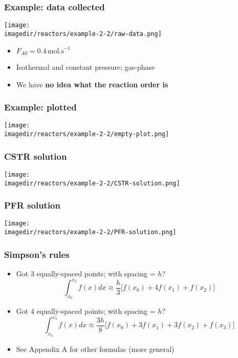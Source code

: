 \begin{frame}\frametitle{Example: data collected}
	\begin{center}
		\texttt{[image: \\imagedir/reactors/example-2-2/raw-data.png]}
	\end{center}
	\vfill
	\begin{itemize}
		\item	$F_{A0} = 0.4\,\text{mol.s}^{-1}$
		\item	Isothermal and constant pressure; gas-phase
		\item	We have \textbf{no idea what the reaction order is}
	\end{itemize}
	\vspace{96pt}
	
\end{frame}

\begin{frame}\frametitle{Example: plotted}
	\begin{center}
		\texttt{[image: \\imagedir/reactors/example-2-2/empty-plot.png]}
	\end{center}
\end{frame}

\begin{frame}\frametitle{CSTR solution}
	\begin{center}
		\texttt{[image: \\imagedir/reactors/example-2-2/CSTR-solution.png]}
	\end{center}
\end{frame}

\begin{frame}\frametitle{PFR solution}
	\begin{center}
		\texttt{[image: \\imagedir/reactors/example-2-2/PFR-solution.png]}
	\end{center}
\end{frame}

\begin{frame}\frametitle{Simpson's rules}
	\begin{itemize}
		\item	Got 3 equally-spaced points; with spacing = $h$?
				$$ \int_{x_0}^{x_2} f(x) dx \approx \dfrac{h}{3}\Biggl[f(x_0) + 4f(x_1) + f(x_2) \Biggr]$$
		\vspace{12pt}
		\item	Got 4 equally-spaced points; with spacing = $h$?
				$$ \int_{x_0}^{x_3} f(x) dx \approx \dfrac{3h}{8}\Biggl[f(x_0) + 3f(x_1) + 3f(x_2) + f(x_3)\Biggr]$$
		\vspace{12pt}
		\item	\small See Appendix A for other formulas (more general)
	\end{itemize}
	
\end{frame}

